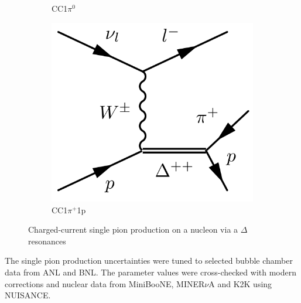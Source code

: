 \begin{figure}[h]
\begin{subfigure}[t]{0.32\textwidth}
		\caption{CC1$\pi^0$}
	\end{subfigure}
	\begin{subfigure}[t]{0.32\textwidth}
		\includegraphics[width=\textwidth, trim={0mm 0mm 0mm 0mm}, clip,page=1]{figures/niwg/diagrams/CC1ppip}
		\caption{CC1$\pi^+$1p}
	\end{subfigure}
	\caption{Charged-current single pion production on a nucleon via a $\Delta$ resonances}
	\label{fig:1pi_diags}
\end{figure}

The single pion production uncertainties were tuned to selected bubble chamber data from ANL\cite{ANL_CC1pi,ANL_NC1pi} and BNL\cite{BNL_CC1pi,BNL_CC1pi_isospin,BNL_NuInt02}. The parameter values were cross-checked with modern corrections\cite{ANL_BNL_corr} and nuclear data from MiniBooNE\cite{MB_CC1pip,MB_CC1pi0,MB_NC1pi0}, MINER$\nu$A\cite{MIN_CC1pi0,MIN_CC1pip,MIN_pion_2016} and K2K \cite{K2K_CC1pip} using NUISANCE\cite{NUISANCE}.

